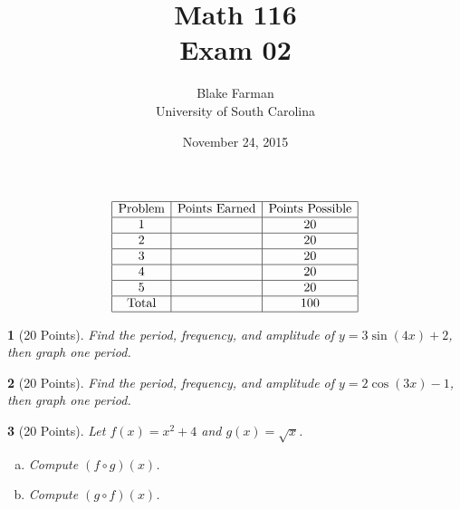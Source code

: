 \documentclass[12pt]{amsart}
\author{Blake Farman\\University of South Carolina}
\title{Math 116\\Exam 02}
\date{November 24, 2015}
\begin{document}
\maketitle

\begin{center}
\end{center}

\vspace{0.2in}
\vspace{0.2in}

$$
\begin{array}{|c|c|c|}
  \hline
  \text{Problem} & \text{Points Earned} & \text{Points Possible}\\
  \hline
  1 & & 20\\
  \hline
  2 & & 20\\
  \hline
  3 & & 20\\
  \hline
  4 & & 20\\
  \hline
  5 & & 20 \\
  \hline
  \text{Total} & & 100\\
  \hline
\end{array}
$$
\newpage

\theoremstyle{plain}
\newtheorem{thm}{}
\newtheorem{lem}{Lemma}
\theoremstyle{definition}
\newtheorem{defn}{Definition}

\begin{thm}[20 Points]\label{ex1}
  Find the period, frequency, and amplitude of $y = 3\sin(4x) + 2$, then graph one period.
\end{thm}

\newpage

\begin{thm}[20 Points]\label{ex2}
  Find the period, frequency, and amplitude of $y = 2\cos(3x) - 1$, then graph one period.
\end{thm}

\newpage
\begin{thm}[20 Points]\label{ex3}
  Let $f(x) = x^2 + 4$ and $g(x) = \sqrt{x}$.
  \begin{enumerate}[(a)]
  \item
    Compute $(f \circ g)(x)$.
    \vspace{2in}
  \item
    Compute $(g \circ f)(x)$.
    \vspace{2in}
  \end{enumerate}
\end{thm}
\end{document}
